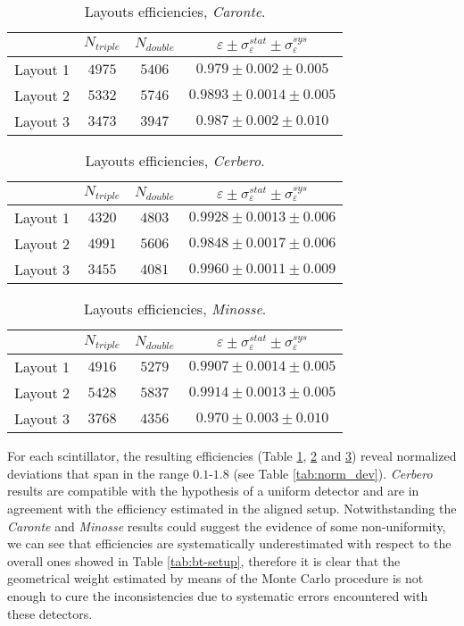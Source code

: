 \begin{table}[!bht]
	\centering
	\begin{tabular}{r|ccc}
		\toprule
		&$N_{triple}$&$N_{double}$&$\varepsilon\pm\sigma_{\varepsilon}^{stat}\pm\sigma_{\varepsilon}^{sys}$\\
		\midrule
		Layout 1 &$4975$ & $5406$ & $0.979\pm 0.002 \pm 0.005$\\
		Layout 2 &$5332$ & $5746$	& $0.9893\pm 0.0014 \pm 0.005$\\
		Layout 3 &$3473$ & $3947$ & $0.987\pm 0.002 \pm 0.010$\\
		\bottomrule	
	\end{tabular}
	\caption{Layouts efficiencies, \emph{Caronte}.}\label{tab:unif_caronte}
\end{table}
\begin{table}[!hbt]
	\centering
	\begin{tabular}{r|ccc}
		\toprule
		&$N_{triple}$&$N_{double}$&$\varepsilon\pm\sigma_{\varepsilon}^{stat}\pm\sigma_{\varepsilon}^{sys}$\\
		\midrule
		Layout 1 &$4320$ & $4803$ & $0.9928\pm 0.0013\pm 0.006$\\
		Layout 2 &$4991$ & $5606$	& $0.9848\pm 0.0017\pm 0.006$\\
		Layout 3 &$3455$ & $4081$ & $0.9960\pm 0.0011\pm 0.009$\\
		\bottomrule	
	\end{tabular}
	\caption{Layouts efficiencies, \emph{Cerbero}.}\label{tab:unif_cerbero}
\end{table}
\begin{table}[!tb]
	\centering
	\begin{tabular}{r|ccc}
		\toprule
		&$N_{triple}$&$N_{double}$&$\varepsilon\pm\sigma_{\varepsilon}^{stat}\pm\sigma_{\varepsilon}^{sys}$\\
		\midrule
		Layout 1 &$4916$ & $5279$ & $0.9907\pm 0.0014\pm 0.005$\\
		Layout 2 &$5428$ & $5837$	& $0.9914\pm 0.0013\pm0.005$\\
		Layout 3 &$3768$ & $4356$ & $0.970\pm 0.003\pm 0.010$\\
		\bottomrule	
	\end{tabular}
	\caption{Layouts efficiencies, \emph{Minosse}.}\label{tab:unif_minosse}
\end{table}


For each scintillator, the resulting efficiencies (Table \ref{tab:unif_caronte}, \ref{tab:unif_cerbero} and \ref{tab:unif_minosse}) reveal normalized deviations that span in the range $0.1$-$1.8$ (see Table \ref{tab:norm_dev}). \emph{Cerbero} results are compatible with the hypothesis of a uniform detector and are in agreement with the efficiency estimated in the aligned setup.  
Notwithstanding the \emph{Caronte} and \emph{Minosse} results could suggest the evidence of some non-uniformity, we can see that efficiencies are systematically underestimated with respect to the overall ones showed in Table \ref{tab:bt-setup}, therefore it is clear that the geometrical weight estimated by means of the Monte Carlo procedure is not enough to cure the inconsistencies due to systematic errors encountered with these detectors.

